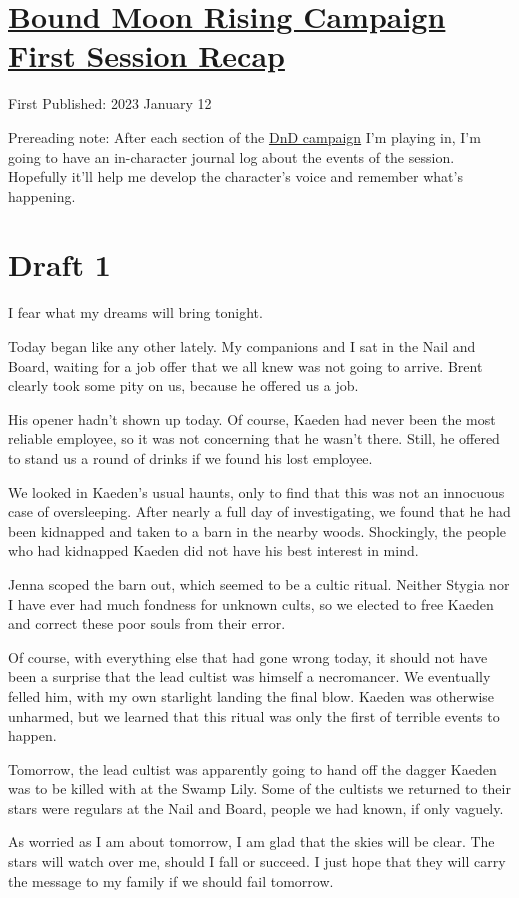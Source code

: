 \documentclass[12pt]{article}[titlepage]
\renewcommand{\,}{\textsuperscript{,}}
\begin{document}
\doublespacing
\section{\href{bound-moon-rising-1.html}{Bound Moon Rising Campaign First Session Recap}}
First Published: 2023 January 12

Prereading note: After each section of the \href{dungeons-dragons-rex-0.html}{DnD campaign} I'm playing in, I'm going to have an in-character journal log about the events of the session.
Hopefully it'll help me develop the character's voice and remember what's happening.
\section{Draft 1}
I fear what my dreams will bring tonight.

Today began like any other lately.
My companions and I sat in the Nail and Board, waiting for a job offer that we all knew was not going to arrive.
Brent clearly took some pity on us, because he offered us a job.

His opener hadn't shown up today.
Of course, Kaeden had never been the most reliable employee, so it was not concerning that he wasn't there.
Still, he offered to stand us a round of drinks if we found his lost employee.

We looked in Kaeden's usual haunts, only to find that this was not an innocuous case of oversleeping.
After nearly a full day of investigating, we found that he had been kidnapped and taken to a barn in the nearby woods.
Shockingly, the people who had kidnapped Kaeden did not have his best interest in mind.

Jenna scoped the barn out, which seemed to be a cultic ritual.
Neither Stygia nor I have ever had much fondness for unknown cults, so we elected to free Kaeden and correct these poor souls from their error.

Of course, with everything else that had gone wrong today, it should not have been a surprise that the lead cultist was himself a necromancer.
We eventually felled him, with my own starlight landing the final blow.
Kaeden was otherwise unharmed, but we learned that this ritual was only the first of terrible events to happen.

Tomorrow, the lead cultist was apparently going to hand off the dagger Kaeden was to be killed with at the Swamp Lily.
Some of the cultists we returned to their stars were regulars at the Nail and Board, people we had known, if only vaguely.

As worried as I am about tomorrow, I am glad that the skies will be clear.
The stars will watch over me, should I fall or succeed.
I just hope that they will carry the message to my family if we should fail tomorrow.
\end{document}
